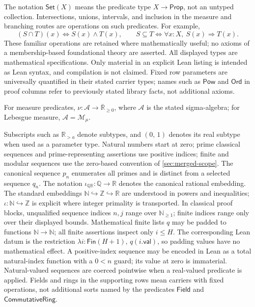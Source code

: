 \documentclass[11pt,reqno]{amsart}
\newcommand{\N}{\mathbb N}
\newcommand{\Z}{\mathbb Z}
\newcommand{\Q}{\mathbb Q}
\newcommand{\R}{\mathbb R}
\newcommand{\Np}{\N_{\ge1}}
\theoremstyle{blueplain}
\newcounter{type}
\newcounter{asser}
\providecommand{\comma}{\allowbreak,\,}
\numberwithin{equation}{section}
\begin{document}
The notation $\textsf{Set}(X)$ means the predicate type
$X\to\textsf{Prop}$, not an untyped collection. Intersections, unions,
intervals, and inclusion in the measure and branching routes are operations
on such predicates. For example,
\[
(S\cap T)(x)\iff S(x)\wedge T(x),\qquad
S\subseteq T\iff\forall x:X,\ S(x)\Rightarrow T(x).
\]
These familiar operations are retained where mathematically useful; no
axioms of a membership-based foundational theory are asserted.
All displayed types are mathematical specifications. Only material in an
explicit Lean listing is intended as Lean syntax, and compilation is not
claimed. Fixed row parameters are universally quantified in their stated
carrier types; names such as $\textsf{Pow}$ and $\textsf{Ord}$ in proof
columns refer to previously stated library facts, not additional axioms.

For measure predicates,
\(\nu:\mathcal A\to\overline{\R}_{\ge0}\),
where \(\mathcal A\) is the stated sigma-algebra;
for Lebesgue measure, \(\mathcal A=\mathcal M_\mu\).

Subscripts such as \(\R_{>a}\) denote subtypes, and \((0\comma 1)\) denotes its real
subtype when used as a parameter type. Natural numbers start at zero; prime
classical sequences and prime-representing assertions use positive indices;
finite and modular sequences use the zero-based convention of \cref{sec:merged-scope}. The canonical
sequence \(p_n\) enumerates all primes and is distinct from a selected sequence
\(q_n\). The notation $\iota_{\Q\R}:\Q\to\R$ denotes the canonical rational embedding. The standard embeddings \(\N\hookrightarrow\Z\hookrightarrow\R\)
are understood in powers and inequalities; \(\iota:\N\hookrightarrow\Z\)
is explicit where integer primality is transported. In classical proof blocks,
unqualified sequence indices \(n,j\) range over \(\Np\); finite indices
range only over their displayed bounds. Mathematical finite lists $q$ may
be padded to functions $\N\to\N$; all finite assertions inspect only
$i\le H$. The corresponding Lean datum is the restriction
$\lambda i:\textsf{Fin}(H+1),\,q(i.\textsf{val})$, so padding values
have no mathematical effect. A positive-index sequence may be
encoded in Lean as a total natural-index function with a \(0<n\) guard;
its value at zero is immaterial. Natural-valued sequences are coerced
pointwise when a real-valued predicate is applied. Fields and rings in the
supporting rows mean carriers with fixed operations, not additional sorts
named by the predicates \(\textsf{Field}\) and \(\textsf{CommutativeRing}\).
\end{document}
